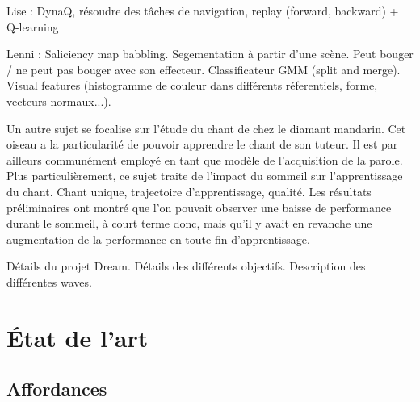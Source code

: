 \documentclass[draft]{llncs}
\begin{document}
Lise : DynaQ, résoudre des tâches de navigation, replay (forward, backward) + Q-learning

Lenni : Saliciency map babbling. Segementation à partir d'une scène.
Peut bouger / ne peut pas bouger avec son effecteur.
 Classificateur GMM (split and merge). Visual features (histogramme de couleur dans différents réferentiels, forme, vecteurs normaux...).

Un autre sujet se focalise sur l'étude du chant de chez le diamant mandarin.
Cet oiseau a la particularité de pouvoir apprendre le chant de son tuteur.
Il est par ailleurs communément employé en tant que modèle de l'acquisition de la parole.
Plus particulièrement, ce sujet traite de l'impact du sommeil sur l'apprentissage du chant.
Chant unique, trajectoire d'apprentissage, qualité.
Les résultats préliminaires ont montré que l'on pouvait observer une baisse de performance durant le sommeil, à court terme donc, mais qu'il y avait en revanche une  augmentation de la performance en toute fin d'apprentissage.



Détails du projet Dream.
Détails des différents objectifs.
Description des différentes waves.



\section{\'Etat de l'art}





\subsection{Affordances}
\end{document}
